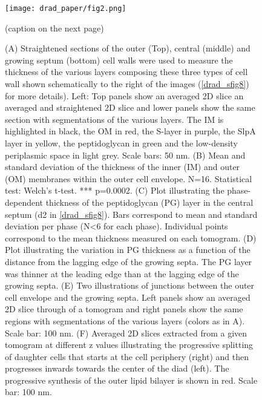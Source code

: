 \begin{figure}[ht]
    \centering
    \texttt{[image: drad\_paper/fig2.png]}
    \caption[In-depth analysis of the structure and composition of the cell wall of D. radiodurans]{(caption on the next page)}
    \label{drad_fig2}
\end{figure}
\begin{figure}[ht]
    \ContinuedFloat
    \caption{(A) Straightened sections of the outer (Top), central (middle) and growing septum (bottom) cell walls were used to measure the thickness of the various layers composing these three types of cell wall shown schematically to the right of the images (\autoref{drad_sfig8}) for more details). Left: Top panels show an averaged 2D slice an averaged and straightened 2D slice and lower panels show the same section with segmentations of the various layers. The IM is highlighted in black, the OM in red, the S-layer in purple, the SlpA layer in yellow, the peptidoglycan in green and the low-density periplasmic space in light grey. Scale bars: 50 nm. (B) Mean and standard deviation of the thickness of the inner (IM) and outer (OM) membranes within the outer cell envelope. N=16. Statistical test: Welch's t-test. *** p=0.0002. (C) Plot illustrating the phase-dependent thickness of the peptidoglycan (PG) layer in the central septum (d2 in \autoref{drad_sfig8}). Bars correspond to mean and standard deviation per phase (N<6 for each phase). Individual points correspond to the mean thickness measured on each tomogram. (D) Plot illustrating the variation in PG thickness as a function of the distance from the lagging edge of the growing septa. The PG layer was thinner at the leading edge than at the lagging edge of the growing septa. (E) Two illustrations of junctions between the outer cell envelope and the growing septa. Left panels show an averaged 2D slice through of a tomogram and right panels show the same regions with segmentations of the various layers (colors as in A). Scale bar: 100 nm. (F) Averaged 2D slices extracted from a given tomogram at different z values illustrating the progressive splitting of daughter cells that starts at the cell periphery (right) and then progresses inwards towards the center of the diad (left). The progressive synthesis of the outer lipid bilayer is shown in red. Scale bar: 100 nm.}
\end{figure}


